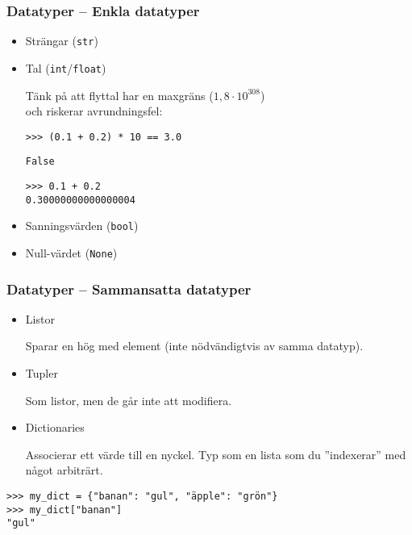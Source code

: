 \documentclass{beamer}
\begin{document}
  \begin{frame}[fragile]
    \frametitle{Datatyper -- Enkla datatyper}

    \pause{}

    \begin{itemize}
      \item Strängar (\texttt{str})
      \pause{}

      \item Tal (\texttt{int}/\texttt{float})
      \pause{}

        Tänk på att flyttal har en maxgräns (\(1,8 \cdot 10^{308}\)) \\
        \pause{}
        och riskerar avrundningsfel:
        \pause{}

\begin{verbatim}
>>> (0.1 + 0.2) * 10 == 3.0
\end{verbatim}
\vspace{-0.5em}
\pause{}
\begin{verbatim}
False
\end{verbatim}
\pause{}
\begin{verbatim}
>>> 0.1 + 0.2
0.30000000000000004
\end{verbatim}
\vspace{-0.5em}

      \pause{}
      \item Sanningsvärden (\texttt{bool})

      \pause{}
      \item Null-värdet (\texttt{None})

    \end{itemize}

  \end{frame}

  \begin{frame}[fragile]
    \frametitle{Datatyper -- Sammansatta datatyper}

    \pause{}

    \begin{itemize}
      \item Listor

      Sparar en hög med element (inte nödvändigtvis av samma datatyp).

      \pause{}

      \item Tupler

      Som listor, men de går inte att modifiera.

      \pause{}

      \item Dictionaries

      Associerar ett värde till en nyckel. Typ som en lista som du ''indexerar''
      med något arbiträrt.

    \end{itemize}

    \pause{}

    \begin{verbatim}
>>> my_dict = {"banan": "gul", "äpple": "grön"}
>>> my_dict["banan"]
"gul"
    \end{verbatim}


  \end{frame}
\end{document}
